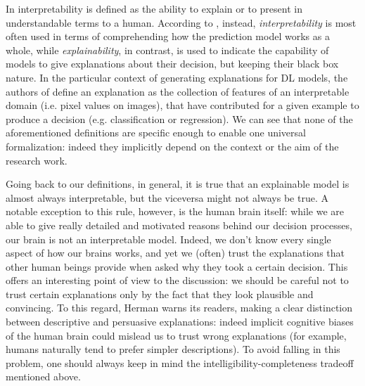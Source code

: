 In \cite{doshivelez2017rigorous} interpretability is defined as the ability to explain or to present in understandable terms to a human. According to \cite{burkart2021survey}, instead, \textit{interpretability} is most often used in terms of comprehending how the prediction model works as a whole, while \textit{explainability}, in contrast, is used to indicate the capability of models to give explanations about their decision, but keeping their black box nature. In the particular context of generating explanations for DL models, the authors of \cite{montavon2018methods} define an explanation as the collection of features of an interpretable domain (i.e. pixel values on images), that have contributed for a given example to produce a decision (e.g. classification or regression). We can see that none of the aforementioned definitions are specific enough to enable one universal formalization: indeed they implicitly  depend on the context or the aim of the research work. 

Going back to our definitions, in general, it is true that an explainable model is almost always interpretable, but the viceversa might not always be true. A notable exception to this rule, however, is the human brain itself: while we are able to give really detailed and motivated reasons behind our decision processes, our brain is not an interpretable model. Indeed, we don't know every single aspect of how our brains works, and yet we (often) trust the explanations that other human beings provide when asked why they took a certain decision. This offers an interesting point of view to the discussion: we should be careful not to trust certain explanations only by the fact that they look plausible and convincing. To this regard, Herman \cite{Herman2017ThePA} warns its readers, making a clear distinction between descriptive and persuasive explanations: indeed implicit cognitive biases of the human brain could mislead us to trust wrong explanations (for example, humans naturally tend to prefer simpler descriptions). To avoid falling in this problem, one should always keep in mind the intelligibility-completeness tradeoff mentioned above.

